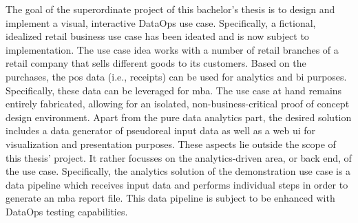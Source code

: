 The goal of the superordinate project of this bachelor's thesis is to design and implement a visual, interactive DataOps use case. Specifically, a fictional, idealized retail business use case has been ideated and is now subject to implementation. The use case idea works with a number of retail branches of a retail company that sells different goods to its customers. Based on the purchases, the \ac{pos} data (i.e., receipts) can be used for analytics and \ac{bi} purposes. Specifically, these data can be leveraged for \ac{mba}. The use case at hand remains entirely fabricated, allowing for an isolated, non-business-critical proof of concept design environment. Apart from the pure data analytics part, the desired solution includes a data generator of pseudoreal input data as well as a web \acs{ui} for visualization and presentation purposes. These aspects lie outside the scope of this thesis' project. It rather focusses on the analytics-driven area, or back end, of the use case. Specifically, the analytics solution of the demonstration use case is a data pipeline which receives input data and performs individual steps in order to generate an \ac{mba} report file. This data pipeline is subject to be enhanced with DataOps testing capabilities.
